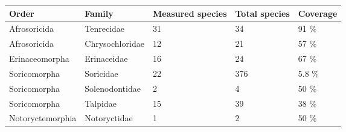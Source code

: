 

\begin{tabular}{p{3.4cm}p{3cm}p{2cm}p{2cm}p{2cm}}

\hline
\textbf{Order} & \textbf{Family} & \textbf{Measured species} & \textbf{Total species} & \textbf{Coverage} \\
\hline
Afrosoricida & Tenrecidae & 31 & 34 & 91 \% \\
Afrosoricida & Chrysochloridae & 12 & 21 & 57 \% \\
Erinaceomorpha & Erinaceidae & 16 & 24 & 67 \% \\
Soricomorpha & Soricidae & 22 & 376 & 5.8 \% \\
Soricomorpha & Solenodontidae & 2 & 4 & 50 \% \\
Soricomorpha & Talpidae & 15 & 39 & 38 \% \\
Notoryctemorphia & Notoryctidae & 1 & 2 & 50 \% \\
\hline

\end{tabular}

